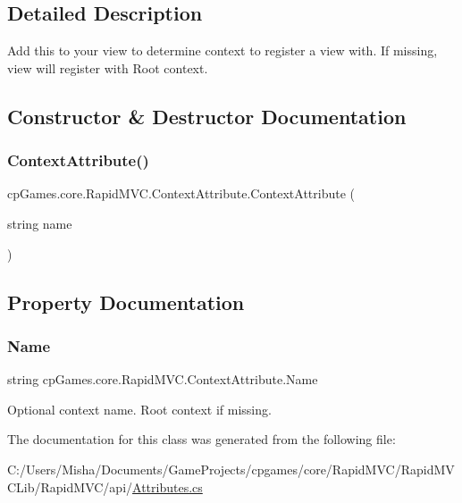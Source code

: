 \subsection{Detailed Description}
Add this to your view to determine context to register a view with. If missing, view will register with Root context. 



\subsection{Constructor \& Destructor Documentation}
\mbox{\label{classcp_games_1_1core_1_1_rapid_m_v_c_1_1_context_attribute_a2f20f2c5247220479a0844d4931b6395}} 
\subsubsection{\texorpdfstring{ContextAttribute()}{ContextAttribute()}}
{\footnotesize\ttfamily cp\+Games.\+core.\+Rapid\+M\+V\+C.\+Context\+Attribute.\+Context\+Attribute (\begin{DoxyParamCaption}\item[{string}]{name }\end{DoxyParamCaption})}



\subsection{Property Documentation}
\mbox{\label{classcp_games_1_1core_1_1_rapid_m_v_c_1_1_context_attribute_aeeb0490378fbdbaedbc5c3e0d5200c87}} 
\subsubsection{\texorpdfstring{Name}{Name}}
{\footnotesize\ttfamily string cp\+Games.\+core.\+Rapid\+M\+V\+C.\+Context\+Attribute.\+Name\hspace{0.3cm}{\ttfamily [get]}}



Optional context name. Root context if missing. 



The documentation for this class was generated from the following file\+:\begin{DoxyCompactItemize}
\item 
C\+:/\+Users/\+Misha/\+Documents/\+Game\+Projects/cpgames/core/\+Rapid\+M\+V\+C/\+Rapid\+M\+V\+C\+Lib/\+Rapid\+M\+V\+C/api/\mbox{\hyperlink{_attributes_8cs}{Attributes.\+cs}}\end{DoxyCompactItemize}

